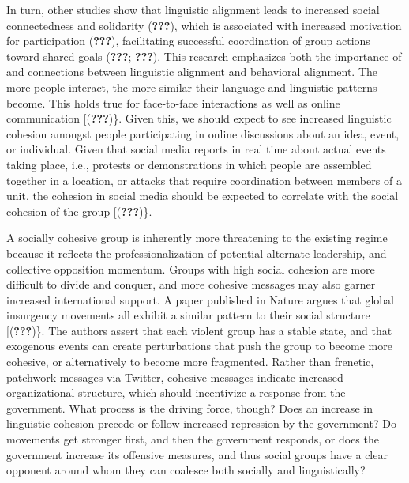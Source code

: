 \documentclass[english,man]{apa6}
\begin{document}
In turn, other studies show that linguistic alignment leads to increased social connectedness and solidarity ({\textbf{???}}), which is associated with increased motivation for participation ({\textbf{???}}), facilitating successful coordination of group actions toward shared goals ({\textbf{???}}; {\textbf{???}}). This research emphasizes both the importance of and connections between linguistic alignment and behavioral alignment. The more people interact, the more similar their language and linguistic patterns become. This holds true for face-to-face interactions as well as online communication {[}({\textbf{???}})\}. Given this, we should expect to see increased linguistic cohesion amongst people participating in online discussions about an idea, event, or individual. Given that social media reports in real time about actual events taking place, i.e., protests or demonstrations in which people are assembled together in a location, or attacks that require coordination between members of a unit, the cohesion in social media should be expected to correlate with the social cohesion of the group {[}({\textbf{???}})\}.

A socially cohesive group is inherently more threatening to the existing regime because it reflects the professionalization of potential alternate leadership, and collective opposition momentum. Groups with high social cohesion are more difficult to divide and conquer, and more cohesive messages may also garner increased international support. A paper published in Nature argues that global insurgency movements all exhibit a similar pattern to their social structure {[}({\textbf{???}})\}. The authors assert that each violent group has a stable state, and that exogenous events can create perturbations that push the group to become more cohesive, or alternatively to become more fragmented. Rather than frenetic, patchwork messages via Twitter, cohesive messages indicate increased organizational structure, which should incentivize a response from the government. What process is the driving force, though? Does an increase in linguistic cohesion precede or follow increased repression by the government? Do movements get stronger first, and then the government responds, or does the government increase its offensive measures, and thus social groups have a clear opponent around whom they can coalesce both socially and linguistically?
\end{document}
